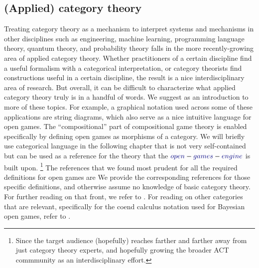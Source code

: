 \documentclass[11pt,titlepage,dvipsnames,table,xcdraw,english]{article}
\newcommand{\Varid}[1]{\mathit{#1}}
\renewcommand{\Varid}[1]{{\color{typeColor}{#1}}}
\begin{document}

\subsection{(Applied) category theory}
Treating category theory as a mechanism to interpret systems and mechanisms in other disciplines such as engineering, machine learning, programming language theory, quantum theory, and probability theory falls in the more recently-growing area of applied category theory. Whether practitioners of a certain discipline find a useful formalism with a categorical interpretation, or category theorists find constructions useful in a certain discipline, the result is a nice interdisciplinary area of research. But overall, it can be difficult to characterize what applied category theory truly is in a handful of words. We suggest \cite{fong2018sevensketchescompositionalityinvitation} as an introduction to more of these topics. For example, a graphical notation used across some of these applications are string diagrams, which also serve as a nice intuitive language for open games. The ``compositional'' part of compositional game theory is enabled specifically by defining open games as morphisms of a category. We will briefly use categorical language in the following chapter that is not very self-contained but can be used as a reference for the theory that the \ensuremath{\Varid{open}\mathbin{-}\Varid{games}\mathbin{-}\Varid{engine}} is built upon. \footnote{Since the target audience (hopefully) reaches farther and farther away from just category theory experts, and hopefully growing the broader ACT commmunity as an interdisciplinary effort.} The references that we found most prudent for all the required definitions for open games are \cite{HedgesThesis,BayesianOpenGames} We provide the corresponding references for those specific definitions, and otherwise assume no knowledge of basic category theory. For further reading on that front, we refer to \cite{mac1971categories}. For reading on other categories that are relevant, specifically for the coend calculus notation used for Bayesian open games, refer to \cite{riley2018categories}.
\end{document}
